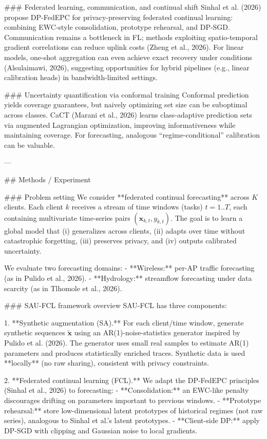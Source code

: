 ### Federated learning, communication, and continual shift  
Sinhal et al. (2026) propose DP-FedEPC for privacy-preserving federated continual learning: combining EWC-style consolidation, prototype rehearsal, and DP-SGD. Communication remains a bottleneck in FL; methods exploiting spatio-temporal gradient correlations can reduce uplink costs (Zheng et al., 2026). For linear models, one-shot aggregation can even achieve exact recovery under conditions (Alsulaimawi, 2026), suggesting opportunities for hybrid pipelines (e.g., linear calibration heads) in bandwidth-limited settings.

### Uncertainty quantification via conformal training  
Conformal prediction yields coverage guarantees, but naively optimizing set size can be suboptimal across classes. CaCT (Marani et al., 2026) learns class-adaptive prediction sets via augmented Lagrangian optimization, improving informativeness while maintaining coverage. For forecasting, analogous “regime-conditional” calibration can be valuable.

---

## Methods / Experiment  

### Problem setting  
We consider **federated continual forecasting** across \(K\) clients. Each client \(k\) receives a stream of time windows (tasks) \(t=1..T\), each containing multivariate time-series pairs \((\mathbf{x}_{k,t}, y_{k,t})\). The goal is to learn a global model that (i) generalizes across clients, (ii) adapts over time without catastrophic forgetting, (iii) preserves privacy, and (iv) outputs calibrated uncertainty.

We evaluate two forecasting domains:
- **Wireless:** per-AP traffic forecasting (as in Pulido et al., 2026).  
- **Hydrology:** streamflow forecasting under data scarcity (as in Tlhomole et al., 2026).  

### SAU-FCL framework overview  
SAU-FCL has three components:

1. **Synthetic augmentation (SA).**  
   For each client/time window, generate synthetic sequences \(\tilde{\mathbf{x}}\) using an AR(1)-noise-statistics generator inspired by Pulido et al. (2026). The generator uses small real samples to estimate AR(1) parameters and produces statistically enriched traces. Synthetic data is used **locally** (no raw sharing), consistent with privacy constraints.

2. **Federated continual learning (FCL).**  
   We adapt the DP-FedEPC principles (Sinhal et al., 2026) to forecasting:
   - **Consolidation:** an EWC-like penalty discourages drifting on parameters important to previous windows.  
   - **Prototype rehearsal:** store low-dimensional latent prototypes of historical regimes (not raw series), analogous to Sinhal et al.’s latent prototypes.  
   - **Client-side DP:** apply DP-SGD with clipping and Gaussian noise to local gradients.

